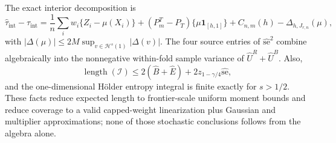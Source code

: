 The exact interior decomposition is
\[
\widehat\tau_{\mathrm{int}}-\tau_{\mathrm{int}}
=\frac1n\sum_iw_i\{Z_i-\mu(X_i)\}+(P_m^T-P_T)\{\mu\mathbf 1_{[h,1]}\}+C_{n,m}(h)-\Delta_{h,J_{r,n}}(\mu),
\]
with \(|\Delta(\mu)|\le2M\sup_{v\in\mathcal H^s(1)}|\Delta(v)|\). The four source entries of \(\widehat{\mathrm{se}}^2\) combine algebraically into the nonnegative within-fold sample variance of \(\widehat U^R+\widehat U^B\). Also,
\[
\operatorname{length}(\mathcal I)
\le2(\widehat B+\widehat E)+2z_{1-\gamma/4}\widehat{\mathrm{se}},
\]
and the one-dimensional Hölder entropy integral is finite exactly for \(s>1/2\). These facts reduce expected length to frontier-scale uniform moment bounds and reduce coverage to a valid capped-weight linearization plus Gaussian and multiplier approximations; none of those stochastic conclusions follows from the algebra alone.
